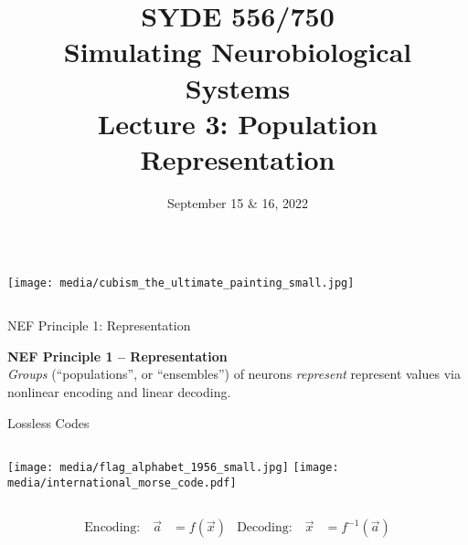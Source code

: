 \documentclass[handout,aspectratio=169]{beamer}
\date{September 15 \& 16, 2022}
\title{SYDE 556/750 \\ Simulating Neurobiological Systems \\ Lecture 3: Population Representation}
\begin{document}
	
\begin{frame}{}
	\vspace{0.5cm}
	\begin{columns}[c]
		\MakeTitle
		\texttt{[image: media/cubism\_the\_ultimate\_painting\_small.jpg]}
	\end{columns}
\end{frame}



\begin{frame}{NEF Principle 1: Representation}
	\begin{mdframed}
		\textbf{NEF Principle 1 -- Representation}\\
		\emph{Groups} (\enquote{populations}, or \enquote{ensembles}) of neurons \emph{represent} represent values via nonlinear encoding and linear decoding.
	\end{mdframed}
\end{frame}

\begin{frame}{Lossless Codes}
	\vspace{0.5cm}
	\begin{columns}
		\texttt{[image: media/flag\_alphabet\_1956\_small.jpg]}
		\texttt{[image: media/international\_morse\_code.pdf]}
	\end{columns}
	\vspace{0.25cm}
	\begin{align*}
		\text{Encoding:} \quad \vec a &= f(\vec x) & \text{Decoding:} \quad \vec x &= f^{-1}(\vec a)
	\end{align*}
\end{frame}
\end{document}

